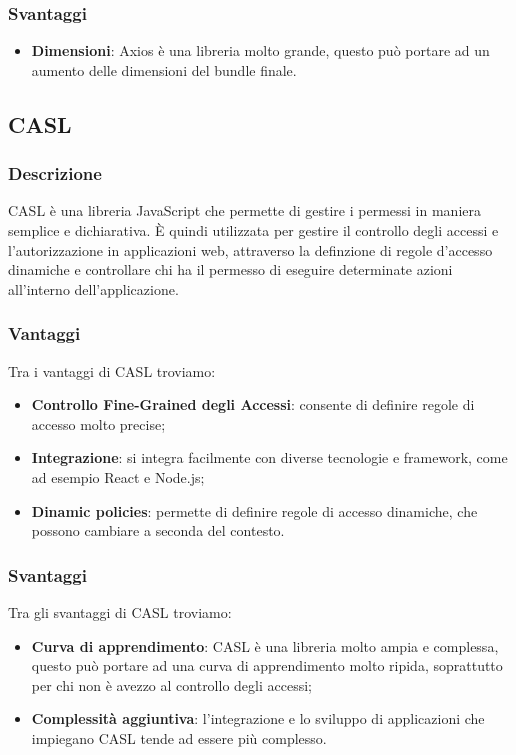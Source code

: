 \subsubsection*{Svantaggi}
\begin{itemize}
    \item \textbf{Dimensioni}: Axios è una libreria molto grande, questo può portare ad un aumento delle dimensioni del bundle finale.
\end{itemize}


\subsection*{CASL}

\subsubsection*{Descrizione}
CASL è una libreria JavaScript che permette di gestire i permessi in maniera semplice
e dichiarativa. È quindi utilizzata per gestire il controllo degli accessi e l'autorizzazione in applicazioni web, attraverso la definzione di regole d'accesso dinamiche e controllare chi ha il permesso di eseguire determinate azioni all'interno dell'applicazione.

\subsubsection*{Vantaggi}
Tra i vantaggi di CASL troviamo:
\begin{itemize}
    \item \textbf{Controllo Fine-Grained degli Accessi}: consente di definire regole di accesso molto precise;
    \item \textbf{Integrazione}: si integra facilmente con diverse tecnologie e framework, come ad esempio React e Node.js;
    \item \textbf{Dinamic policies}: permette di definire regole di accesso dinamiche, che possono cambiare a seconda del contesto.
\end{itemize}

\subsubsection*{Svantaggi}
Tra gli svantaggi di CASL troviamo:
\begin{itemize}
    \item \textbf{Curva di apprendimento}: CASL è una libreria molto ampia e complessa, questo può portare ad una curva di apprendimento molto ripida, soprattutto per chi non è avezzo al controllo degli accessi;
    \item \textbf{Complessità aggiuntiva}: l'integrazione e lo sviluppo di applicazioni che impiegano CASL tende ad essere più complesso.
\end{itemize}


